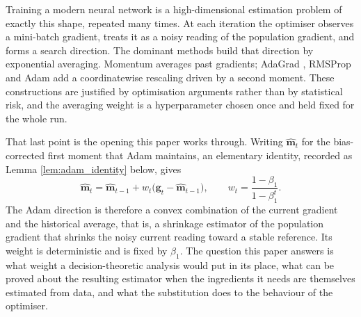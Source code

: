 \documentclass[a4paper,fleqn]{cas-dc}
\theoremstyle{plain}
\theoremstyle{definition}
\theoremstyle{remark}
\begin{document}
Training a modern neural network is a high-dimensional estimation problem of exactly this shape, repeated many times. At each iteration the optimiser observes a mini-batch gradient, treats it as a noisy reading of the population gradient, and forms a search direction. The dominant methods build that direction by exponential averaging. Momentum \citep{polyak1964, sutskever2013} averages past gradients; AdaGrad \citep{duchi2011}, RMSProp \citep{tieleman2012} and Adam \citep{kingma2015} add a coordinatewise rescaling driven by a second moment. These constructions are justified by optimisation arguments rather than by statistical risk, and the averaging weight is a hyperparameter chosen once and held fixed for the whole run.

That last point is the opening this paper works through. Writing $\hat{\bm m}_t$ for the bias-corrected first moment that Adam maintains, an elementary identity, recorded as Lemma \ref{lem:adam_identity} below, gives
\begin{equation}
\label{eq:adam_convex}
\hat{\bm m}_t
=
\hat{\bm m}_{t-1}
+
w_t\bigl(\bm g_t-\hat{\bm m}_{t-1}\bigr),
\qquad
w_t=\frac{1-\beta_1}{1-\beta_1^{t}} .
\end{equation}
The Adam direction is therefore a convex combination of the current gradient and the historical average, that is, a shrinkage estimator of the population gradient that shrinks the noisy current reading toward a stable reference. Its weight is deterministic and is fixed by $\beta_1$. The question this paper answers is what weight a decision-theoretic analysis would put in its place, what can be proved about the resulting estimator when the ingredients it needs are themselves estimated from data, and what the substitution does to the behaviour of the optimiser.
\end{document}
